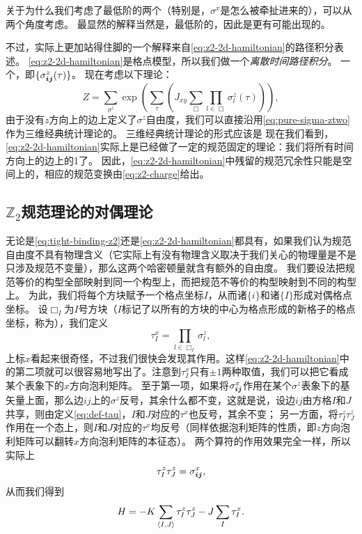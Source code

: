 关于为什么我们考虑了最低阶的两个（特别是，${\sigma}^x$是怎么被牵扯进来的），可以从两个角度考虑。
最显然的解释当然是，最低阶的，因此是更有可能出现的。

不过，实际上更加站得住脚的一个解释来自\eqref{eq:z2-2d-hamiltonian}的路径积分表述。
\eqref{eq:z2-2d-hamiltonian}是格点模型，所以我们做一个\emph{离散时间路径积分}。
一个，即$\{\sigma^z_{\vb*{i} \vb*{j}}(\tau)\}$。
现在考虑以下理论：
\begin{equation}
    Z = \sum_{\sigma^z} \exp(\sum_{\tau} (J_{xy} \sum_{\Box} \prod_{l \in \Box} \sigma_l^z(\tau)  ) ),
\end{equation}
由于没有$z$方向上的边上定义了$\sigma^z$自由度，我们可以直接沿用\eqref{eq:pure-sigma-ztwo}作为三维经典统计理论的。
三维经典统计理论的形式应该是
现在我们看到，\eqref{eq:z2-2d-hamiltonian}实际上是已经做了一定的规范固定的理论：我们将所有时间方向上的边上的1了。
因此，\eqref{eq:z2-2d-hamiltonian}中残留的规范冗余性只能是空间上的，相应的规范变换由\eqref{eq:z2-charge}给出。

\subsection{$\mathbb{Z}_2$规范理论的对偶理论}\label{sec:z2-dual-ising-model}

无论是\eqref{eq:tight-binding-z2}还是\eqref{eq:z2-2d-hamiltonian}都具有，如果我们认为规范自由度不具有物理含义（它实际上有没有物理含义取决于我们关心的物理量是不是只涉及规范不变量），那么这两个哈密顿量就含有额外的自由度。
我们要设法把规范等价的构型全部映射到同一个构型上，而把规范不等价的构型映射到不同的构型上。
为此，我们将每个方块赋予一个格点坐标$I$，从而诸$\{i\}$和诸$\{I\}$形成对偶格点坐标。
设$\Box_I$为$I$号方块（$I$标记了以所有的方块的中心为格点形成的新格子的格点坐标，称为），我们定义
\begin{equation}
    {\tau}^x_I = \prod_{l \in \Box_I} {\sigma}^z_l,
    \label{eq:def-tau}
\end{equation}
上标$x$看起来很奇怪，不过我们很快会发现其作用。这样\eqref{eq:z2-2d-hamiltonian}中的第二项就可以很容易地写出了。注意到$\tau^x_I$只有$\pm 1$两种取值，我们可以把它看成某个表象下的$x$方向泡利矩阵。
至于第一项，如果将${\sigma}_{\vb*{i} \vb*{j}}^x$作用在某个${\sigma}^z$表象下的基矢量上面，那么边$ij$上的$\sigma^z$反号，其余什么都不变，这就是说，设边$ij$由方格$I$和$J$共享，则由定义\eqref{eq:def-tau}，$I$和$J$对应的$\tau^x$也反号，其余不变；
另一方面，将${\tau}^z_I {\tau}^z_J$作用在一个态上，则$I$和$J$对应的$\tau^x$均反号（同样依据泡利矩阵的性质，即$z$方向泡利矩阵可以翻转$x$方向泡利矩阵的本征态）。
两个算符的作用效果完全一样，所以实际上
\begin{equation}
    {\tau}^z_I {\tau}^z_J = {\sigma}^x_{\vb*{i} \vb*{j}},
\end{equation}
从而我们得到
\begin{equation}
    {H} = - K \sum_{\langle I, J \rangle} {\tau}^z_I {\tau}^z_J - J \sum_{I} {\tau}^x_I.
    \label{eq:z2-2d-tau-hamiltonian}
\end{equation}

